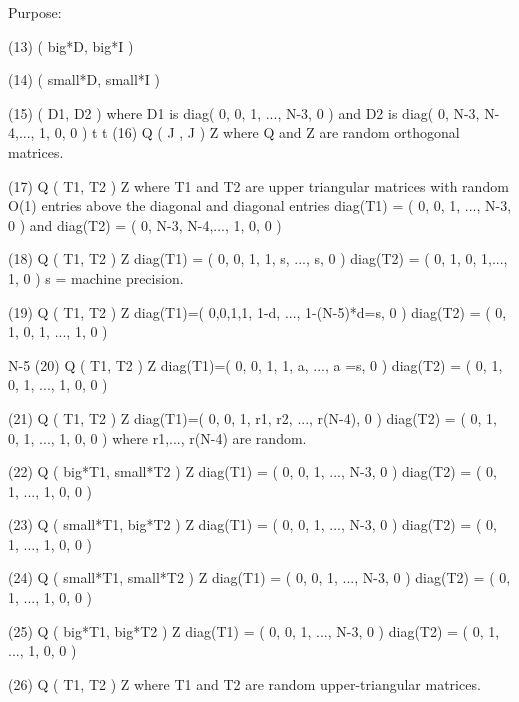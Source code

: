 \begin{DoxyParagraph}{Purpose\+: }
\begin{DoxyVerb}
 (13) ( big*D, big*I )

 (14) ( small*D, small*I )

 (15) ( D1, D2 )        where D1 is diag( 0, 0, 1, ..., N-3, 0 ) and
                        D2 is diag( 0, N-3, N-4,..., 1, 0, 0 )
           t   t
 (16) Q ( J , J ) Z     where Q and Z are random orthogonal matrices.

 (17) Q ( T1, T2 ) Z    where T1 and T2 are upper triangular matrices
                        with random O(1) entries above the diagonal
                        and diagonal entries diag(T1) =
                        ( 0, 0, 1, ..., N-3, 0 ) and diag(T2) =
                        ( 0, N-3, N-4,..., 1, 0, 0 )

 (18) Q ( T1, T2 ) Z    diag(T1) = ( 0, 0, 1, 1, s, ..., s, 0 )
                        diag(T2) = ( 0, 1, 0, 1,..., 1, 0 )
                        s = machine precision.

 (19) Q ( T1, T2 ) Z    diag(T1)=( 0,0,1,1, 1-d, ..., 1-(N-5)*d=s, 0 )
                        diag(T2) = ( 0, 1, 0, 1, ..., 1, 0 )

                                                        N-5
 (20) Q ( T1, T2 ) Z    diag(T1)=( 0, 0, 1, 1, a, ..., a   =s, 0 )
                        diag(T2) = ( 0, 1, 0, 1, ..., 1, 0, 0 )

 (21) Q ( T1, T2 ) Z    diag(T1)=( 0, 0, 1, r1, r2, ..., r(N-4), 0 )
                        diag(T2) = ( 0, 1, 0, 1, ..., 1, 0, 0 )
                        where r1,..., r(N-4) are random.

 (22) Q ( big*T1, small*T2 ) Z    diag(T1) = ( 0, 0, 1, ..., N-3, 0 )
                                  diag(T2) = ( 0, 1, ..., 1, 0, 0 )

 (23) Q ( small*T1, big*T2 ) Z    diag(T1) = ( 0, 0, 1, ..., N-3, 0 )
                                  diag(T2) = ( 0, 1, ..., 1, 0, 0 )

 (24) Q ( small*T1, small*T2 ) Z  diag(T1) = ( 0, 0, 1, ..., N-3, 0 )
                                  diag(T2) = ( 0, 1, ..., 1, 0, 0 )

 (25) Q ( big*T1, big*T2 ) Z      diag(T1) = ( 0, 0, 1, ..., N-3, 0 )
                                  diag(T2) = ( 0, 1, ..., 1, 0, 0 )

 (26) Q ( T1, T2 ) Z     where T1 and T2 are random upper-triangular
                         matrices.\end{DoxyVerb}
 
\end{DoxyParagraph}

